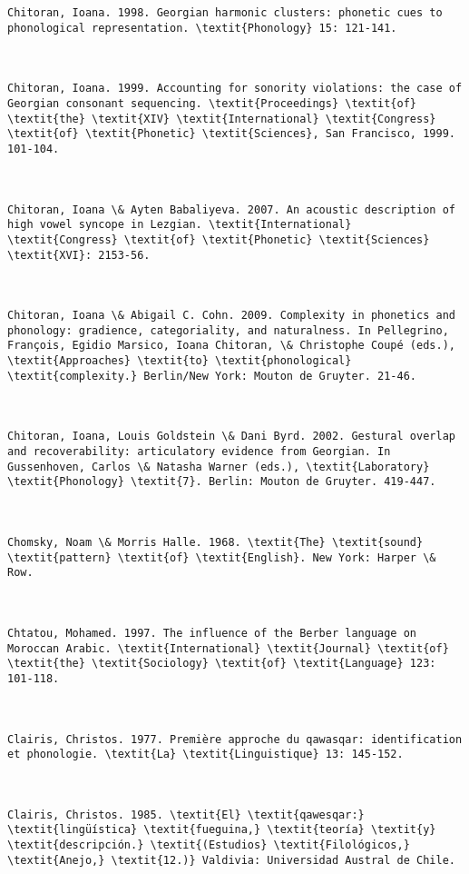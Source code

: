 \begin{verbatim}
Chitoran, Ioana. 1998. Georgian harmonic clusters: phonetic cues to phonological representation. \textit{Phonology} 15: 121-141.



Chitoran, Ioana. 1999. Accounting for sonority violations: the case of Georgian consonant sequencing. \textit{Proceedings} \textit{of} \textit{the} \textit{XIV} \textit{International} \textit{Congress} \textit{of} \textit{Phonetic} \textit{Sciences}, San Francisco, 1999. 101-104.



Chitoran, Ioana \& Ayten Babaliyeva. 2007. An acoustic description of high vowel syncope in Lezgian. \textit{International} \textit{Congress} \textit{of} \textit{Phonetic} \textit{Sciences} \textit{XVI}: 2153-56.



Chitoran, Ioana \& Abigail C. Cohn. 2009. Complexity in phonetics and phonology: gradience, categoriality, and naturalness. In Pellegrino, François, Egidio Marsico, Ioana Chitoran, \& Christophe Coupé (eds.), \textit{Approaches} \textit{to} \textit{phonological} \textit{complexity.} Berlin/New York: Mouton de Gruyter. 21-46.



Chitoran, Ioana, Louis Goldstein \& Dani Byrd. 2002. Gestural overlap and recoverability: articulatory evidence from Georgian. In Gussenhoven, Carlos \& Natasha Warner (eds.), \textit{Laboratory} \textit{Phonology} \textit{7}. Berlin: Mouton de Gruyter. 419-447.



Chomsky, Noam \& Morris Halle. 1968. \textit{The} \textit{sound} \textit{pattern} \textit{of} \textit{English}. New York: Harper \& Row.



Chtatou, Mohamed. 1997. The influence of the Berber language on Moroccan Arabic. \textit{International} \textit{Journal} \textit{of} \textit{the} \textit{Sociology} \textit{of} \textit{Language} 123: 101-118.



Clairis, Christos. 1977. Première approche du qawasqar: identification et phonologie. \textit{La} \textit{Linguistique} 13: 145-152.



Clairis, Christos. 1985. \textit{El} \textit{qawesqar:} \textit{lingüística} \textit{fueguina,} \textit{teoría} \textit{y} \textit{descripción.} \textit{(Estudios} \textit{Filológicos,} \textit{Anejo,} \textit{12.)} Valdivia: Universidad Austral de Chile.




\end{verbatim}

